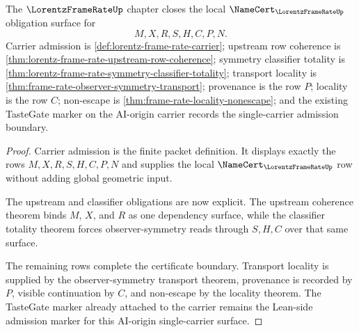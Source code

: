 \begin{theorem}
\label{thm:lorentz-frame-rate-obligation-closure-package}
The $\LorentzFrameRateUp$ chapter closes the local $\NameCert_{\LorentzFrameRateUp}$ obligation surface for
$$
M,X,R,S,H,C,P,N.
$$
Carrier admission is \autoref{def:lorentz-frame-rate-carrier}; upstream row coherence is \autoref{thm:lorentz-frame-rate-upstream-row-coherence}; symmetry classifier totality is \autoref{thm:lorentz-frame-rate-symmetry-classifier-totality}; transport locality is \autoref{thm:frame-rate-observer-symmetry-transport}; provenance is the row $P$; locality is the row $C$; non-escape is \autoref{thm:frame-rate-locality-nonescape}; and the existing TasteGate marker on the AI-origin carrier records the single-carrier admission boundary.
\end{theorem}
\begin{proof}
Carrier admission is the finite packet definition. It displays exactly the rows $M,X,R,S,H,C,P,N$ and supplies the local $\NameCert_{\LorentzFrameRateUp}$ row without adding global geometric input.

The upstream and classifier obligations are now explicit. The upstream coherence theorem binds $M$, $X$, and $R$ as one dependency surface, while the classifier totality theorem forces observer-symmetry reads through $S,H,C$ over that same surface.

The remaining rows complete the certificate boundary. Transport locality is supplied by the observer-symmetry transport theorem, provenance is recorded by $P$, visible continuation by $C$, and non-escape by the locality theorem. The TasteGate marker already attached to the carrier remains the Lean-side admission marker for this AI-origin single-carrier surface.
\end{proof}

